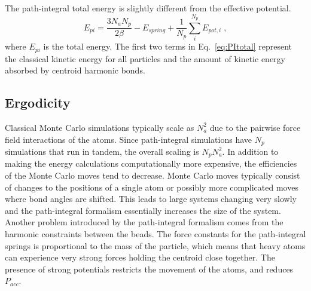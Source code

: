 \documentclass[12pt]{report}
\begin{document}
The path-integral total energy is slightly different from the effective
potential.
\begin{equation}
 \label{eq:PItotal}
 E_{pi} = \frac{3N_aN_p}{2\beta}-E_{spring}
          +\frac{1}{N_p}\sum_i^{N_p} E_{pot,i} \; ,
\end{equation}
where $E_{pi}$ is the total energy. The first two terms in Eq.\
\ref{eq:PItotal} represent the classical kinetic energy for all particles and
the amount of kinetic energy absorbed by centroid harmonic bonds.

\subsection{Ergodicity}

Classical Monte Carlo simulations typically scale as $N_a^2$ due to the
pairwise force field interactions of the atoms. Since path-integral
simulations have $N_p$ simulations that run in tandem, the overall scaling is
$N_pN_a^2$. In addition to making the energy calculations computationally more
expensive, the efficiencies of the Monte Carlo moves tend to decrease. Monte
Carlo moves typically consist of changes to the positions of a single atom or
possibly more complicated moves where bond angles are shifted. This leads to
large systems changing very slowly and the path-integral formalism essentially
increases the size of the system. \\

Another problem introduced by the path-integral formalism comes from the
harmonic constraints between the beads. The force constants for the
path-integral springs is proportional to the mass of the particle, which means
that heavy atoms can experience very strong forces holding the centroid
close together. The presence of strong potentials restricts the movement of
the atoms, and reduces $P_{acc}$.



\end{document}

